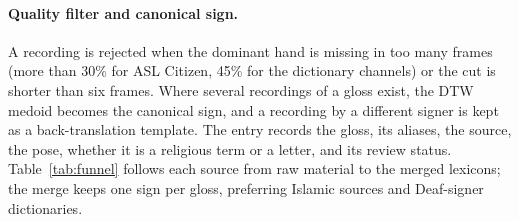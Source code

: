 \paragraph{Quality filter and canonical sign.} A recording is rejected when the dominant hand is missing in too many
frames (more than 30\% for ASL Citizen, 45\% for the dictionary channels) or the cut is shorter than six frames. Where
several recordings of a gloss exist, the DTW medoid becomes the canonical sign, and a recording by a different signer is
kept as a back-translation template. The entry records the gloss, its aliases, the source, the pose, whether it is a
religious term or a letter, and its review status. Table~\ref{tab:funnel} follows each source from raw material to
the merged lexicons; the merge keeps one sign per gloss, preferring Islamic sources and Deaf-signer dictionaries.

